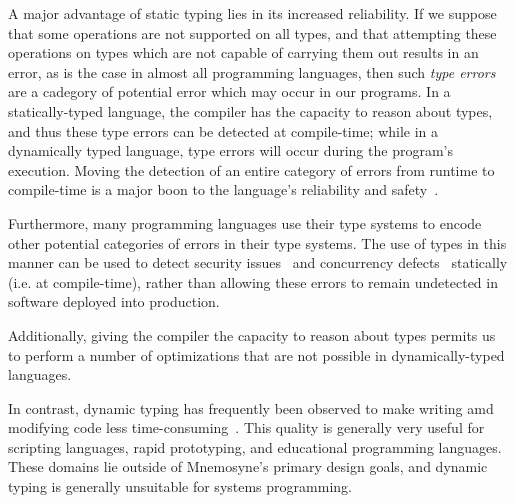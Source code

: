 A major advantage of static typing lies in its increased reliability. If we suppose that some operations are not supported on all types, and that attempting these operations on types which are not capable of carrying them out results in an error, as is the case in almost all programming languages, then such \textit{type errors} are a cadegory of potential error which may occur in our programs. In a statically-typed language, the compiler has the capacity to reason about types, and thus these type errors can be detected at compile-time; while in a dynamically typed language, type errors will occur during the program's execution. Moving the detection of an entire category of errors from runtime to compile-time is a major boon to the language's reliability and safety~\cite{Mitchell:2003:TT:1074100.1074885,Mayer:2012:ESI:2398857.2384666}.

Furthermore, many programming languages use their type systems to encode other potential categories of errors in their type systems. The use of types in this manner can be used to detect security issues~\cite{Skalka:2000:SES:357766.351244} and concurrency defects~\cite{Sagonas:2010:USA:2175429.2175432} statically (i.e. at compile-time), rather than allowing these errors to remain undetected in software deployed into production.

Additionally, giving the compiler the capacity to reason about types permits us to perform a number of optimizations that are not possible in dynamically-typed languages.

In contrast, dynamic typing has frequently been observed to make writing amd modifying code less time-consuming~\cite{Mayer:2012:ESI:2398857.2384666,}. This quality is generally very useful for scripting languages, rapid prototyping, and educational programming languages. These domains lie outside of Mnemosyne's primary design goals, and dynamic typing is generally unsuitable for systems programming.

